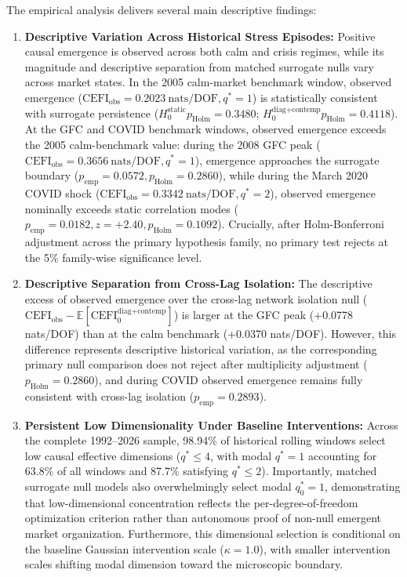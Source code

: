 \documentclass[review,12pt,authoryear]{elsarticle}
\begin{document}
The empirical analysis delivers several main descriptive findings:
\begin{enumerate}
    \item \textbf{Descriptive Variation Across Historical Stress Episodes:} Positive causal emergence is observed across both calm and crisis regimes, while its magnitude and descriptive separation from matched surrogate nulls vary across market states. In the 2005 calm-market benchmark window, observed emergence ($\mathrm{CEFI}_{\text{obs}} = 0.2023\ \mathrm{nats/DOF}, q^* = 1$) is statistically consistent with surrogate persistence ($H_0^{\text{static}} p_{\text{Holm}} = 0.3480$; $H_0^{\text{diag+contemp}} p_{\text{Holm}} = 0.4118$). At the GFC and COVID benchmark windows, observed emergence exceeds the 2005 calm-benchmark value: during the 2008 GFC peak ($\mathrm{CEFI}_{\text{obs}} = 0.3656\ \mathrm{nats/DOF}, q^* = 1$), emergence approaches the surrogate boundary ($p_{\text{emp}} = 0.0572, p_{\text{Holm}} = 0.2860$), while during the March 2020 COVID shock ($\mathrm{CEFI}_{\text{obs}} = 0.3342\ \mathrm{nats/DOF}, q^* = 2$), observed emergence nominally exceeds static correlation modes ($p_{\text{emp}} = 0.0182, z = +2.40, p_{\text{Holm}} = 0.1092$). Crucially, after Holm-Bonferroni adjustment across the primary hypothesis family, no primary test rejects at the 5\% family-wise significance level.
    \item \textbf{Descriptive Separation from Cross-Lag Isolation:} The descriptive excess of observed emergence over the cross-lag network isolation null ($\mathrm{CEFI}_{\text{obs}} - \mathbb{E}[\mathrm{CEFI}_0^{\text{diag+contemp}}]$) is larger at the GFC peak (+0.0778 nats/DOF) than at the calm benchmark (+0.0370 nats/DOF). However, this difference represents descriptive historical variation, as the corresponding primary null comparison does not reject after multiplicity adjustment ($p_{\text{Holm}} = 0.2860$), and during COVID observed emergence remains fully consistent with cross-lag isolation ($p_{\text{emp}} = 0.2893$).
    \item \textbf{Persistent Low Dimensionality Under Baseline Interventions:} Across the complete 1992--2026 sample, 98.94\% of historical rolling windows select low causal effective dimensions ($q^* \le 4$, with modal $q^* = 1$ accounting for 63.8\% of all windows and 87.7\% satisfying $q^* \le 2$). Importantly, matched surrogate null models also overwhelmingly select modal $q_0^* = 1$, demonstrating that low-dimensional concentration reflects the per-degree-of-freedom optimization criterion rather than autonomous proof of non-null emergent market organization. Furthermore, this dimensional selection is conditional on the baseline Gaussian intervention scale ($\kappa = 1.0$), with smaller intervention scales shifting modal dimension toward the microscopic boundary.

\end{enumerate}
\end{document}

